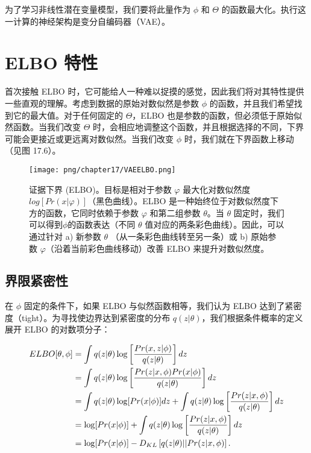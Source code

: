 为了学习非线性潜在变量模型，我们要将此量作为 \(\phi\) 和 \(\Theta\) 的函数最大化。执行这一计算的神经架构是变分自编码器（VAE）。

\section{ELBO 特性 }
首次接触 ELBO 时，它可能给人一种难以捉摸的感觉，因此我们将对其特性提供一些直观的理解。考虑到数据的原始对数似然是参数 \(\phi\) 的函数，并且我们希望找到它的最大值。对于任何固定的 \(\Theta\)，ELBO 也是参数的函数，但必须低于原始似然函数。当我们改变 \(\Theta\) 时，会相应地调整这个函数，并且根据选择的不同，下界可能会更接近或更远离对数似然。当我们改变 \(\phi\) 时，我们就在下界函数上移动（见图 17.6）。

\begin{figure}[ht!]
\centering
\texttt{[image: png/chapter17/VAEELBO.png]}
\caption{证据下界 (ELBO)。目标是相对于参数 \(\varphi\) 最大化对数似然度 \(log[Pr(x|\varphi)]\)（黑色曲线）。ELBO 是一种始终位于对数似然度下方的函数，它同时依赖于参数 \(\varphi\) 和第二组参数 \(\theta\)。当 \(\theta\) 固定时，我们可以得到\(\phi\)的函数表达（不同 \(\theta\) 值对应的两条彩色曲线）。因此，可以通过针对 a) 新参数  \(\theta\) （从一条彩色曲线转至另一条）或 b) 原始参数 \(\varphi\)（沿着当前彩色曲线移动）改善 ELBO 来提升对数似然度。}
\end{figure}


\subsection{界限紧密性}
在 \(\phi\) 固定的条件下，如果 ELBO 与似然函数相等，我们认为 ELBO 达到了紧密度（tight）。为寻找使边界达到紧密度的分布 \(q(z|\theta)\)，我们根据条件概率的定义展开 ELBO 的对数项分子：


\begin{align}
ELBO[\theta, \phi] &= \int q(z|\theta) \log \left[ \frac{Pr(x, z|\phi)}{q(z|\theta)} \right] dz \notag \\
&= \int q(z|\theta) \log \left[ \frac{Pr(z|x, \phi)Pr(x|\phi)}{q(z|\theta)} \right] dz \notag \\
&= \int q(z|\theta) \log [Pr(x|\phi)] dz + \int q(z|\theta) \log \left[ \frac{Pr(z|x, \phi)}{q(z|\theta)} \right] dz \notag \\
&= \log [Pr(x|\phi)] + \int q(z|\theta) \log \left[ \frac{Pr(z|x, \phi)}{q(z|\theta)} \right] dz \notag \\
&= \log [Pr(x|\phi)] - D_{KL} \left[ q(z|\theta) || Pr(z|x, \phi) \right]. 
\end{align} 


